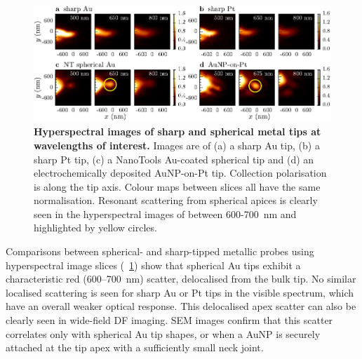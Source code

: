 \documentclass{article}
\begin{document}
\begin{figure}[bt]
\centering
\includegraphics{figures/hyperspectral_tip_comparison}
\caption[Hyperspectral images of sharp and spherical metal tips at wavelengths of interest]{\textbf{Hyperspectral images of sharp and spherical metal tips at wavelengths of interest.} Images are of (a) a sharp Au tip, (b) a sharp Pt tip, (c) a NanoTools Au-coated spherical tip and (d) an electrochemically deposited AuNP-on-Pt tip. Collection polarisation is along the tip axis. Colour maps between slices all have the same normalisation. Resonant scattering from spherical apices is clearly seen in the hyperspectral images of between 600-\SI{700}{nm} and highlighted by yellow circles.}
\label{fig:hyperspectral_tip_comparison}
\vspace{-5pt}
\end{figure}

Comparisons between spherical- and sharp-tipped metallic probes using hyperspectral image slices (\figurename~\ref{fig:hyperspectral_tip_comparison}) show that spherical Au tips exhibit a characteristic red (600--\SI{700}{nm}) scatter, delocalised from the bulk tip. No similar localised scattering is seen for sharp Au or Pt tips in the visible spectrum, which have an overall weaker optical response. This delocalised apex scatter can also be clearly seen in wide-field DF imaging. SEM images confirm that this scatter correlates only with spherical Au tip shapes, or when a AuNP is securely attached at the tip apex with a sufficiently small neck joint.
\end{document}
